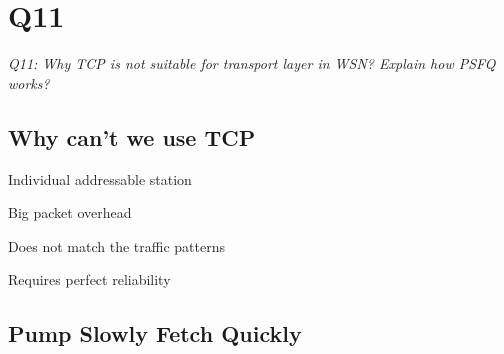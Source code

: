 \chapter{Q11}
\emph{Q11: Why TCP is not suitable for transport layer in WSN? Explain how PSFQ
works?}

\section{Why can’t we use TCP}
\begin{description}
	\item Individual addressable station
	\item Big packet overhead
	\item Does not match the traffic patterns
	\item Requires perfect reliability
\end{description}

\section{Pump Slowly Fetch Quickly}
